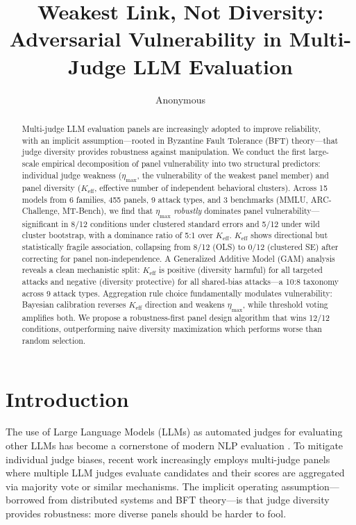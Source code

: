 \documentclass[11pt,a4paper]{article}
\title{Weakest Link, Not Diversity: Adversarial Vulnerability in Multi-Judge LLM Evaluation}
\author{Anonymous}
\begin{document}
\maketitle

\begin{abstract}
Multi-judge LLM evaluation panels are increasingly adopted to improve reliability, with an implicit assumption---rooted in Byzantine Fault Tolerance (BFT) theory---that judge diversity provides robustness against manipulation. We conduct the first large-scale empirical decomposition of panel vulnerability into two structural predictors: individual judge weakness ($\eta_{\max}$, the vulnerability of the weakest panel member) and panel diversity ($K_{\text{eff}}$, effective number of independent behavioral clusters). Across 15 models from 6 families, 455 panels, 9 attack types, and 3 benchmarks (MMLU, ARC-Challenge, MT-Bench), we find that $\eta_{\max}$ \emph{robustly} dominates panel vulnerability---significant in 8/12 conditions under clustered standard errors and 5/12 under wild cluster bootstrap, with a dominance ratio of 5:1 over $K_{\text{eff}}$. $K_{\text{eff}}$ shows directional but statistically fragile association, collapsing from 8/12 (OLS) to 0/12 (clustered SE) after correcting for panel non-independence. A Generalized Additive Model (GAM) analysis reveals a clean mechanistic split: $K_{\text{eff}}$ is positive (diversity harmful) for all targeted attacks and negative (diversity protective) for all shared-bias attacks---a 10:8 taxonomy across 9 attack types. Aggregation rule choice fundamentally modulates vulnerability: Bayesian calibration reverses $K_{\text{eff}}$ direction and weakens $\eta_{\max}$, while threshold voting amplifies both. We propose a robustness-first panel design algorithm that wins 12/12 conditions, outperforming naive diversity maximization which performs worse than random selection.
\end{abstract}

\section{Introduction}

The use of Large Language Models (LLMs) as automated judges for evaluating other LLMs has become a cornerstone of modern NLP evaluation \cite{zheng2023judging}. To mitigate individual judge biases, recent work increasingly employs multi-judge panels where multiple LLM judges evaluate candidates and their scores are aggregated via majority vote or similar mechanisms. The implicit operating assumption---borrowed from distributed systems and BFT theory---is that judge diversity provides robustness: more diverse panels should be harder to fool.
\end{document}
